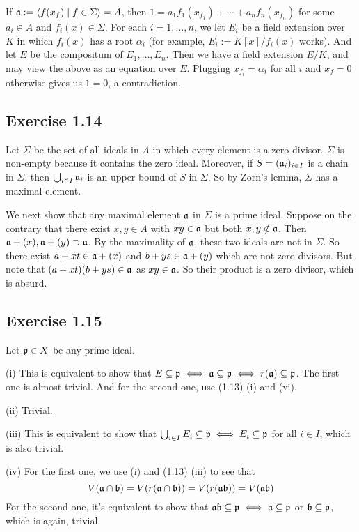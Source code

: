 \documentclass[../A&M.tex]{subfiles}
\begin{document}
If $\mathfrak{a}:=\langle f(x_f) \mid f\in\Sigma \rangle = A$, then $1=a_1f_1(x_{f_1})+\cdots+a_nf_n(x_{f_n})$ for some $a_i\in A$ and $f_i(x)\in\Sigma$. For each $i=1,\ldots,n$, we let $E_i$ be a field extension over $K$ in which $f_i(x)$ has a root $\alpha_i$ (for example, $E_i:=K[x]/f_i(x)$ works). And let $E$ be the compositum of $E_1,\ldots,E_n$. Then we have a field extension $E/K$, and may view the above as an equation over $E$. Plugging $x_{f_i} = \alpha_i$ for all $i$ and $x_f=0$ otherwise gives us $1=0$, a contradiction.

\subsection*{Exercise 1.14}

Let $\Sigma$ be the set of all ideals in $A$ in which every element is a zero divisor. $\Sigma$ is non-empty because it contains the zero ideal. Moreover, if $S=(\mathfrak{a}_i)_{i\in I}$ is a chain in $\Sigma$, then $\bigcup_{i\in I} \mathfrak{a}_i$ is an upper bound of $S$ in $\Sigma$. So by Zorn's lemma, $\Sigma$ has a maximal element.

We next show that any maximal element $\mathfrak{a}$ in $\Sigma$ is a prime ideal. Suppose on the contrary that there exist $x,y\in A$ with $xy\in\mathfrak{a}$ but both $x,y\notin\mathfrak{a}$. Then $\mathfrak{a}+(x),\mathfrak{a}+(y) \supset \mathfrak{a}$. By the maximality of $\mathfrak{a}$, these two ideals are not in $\Sigma$. So there exist $a+xt\in\mathfrak{a}+(x)$ and $b+ys\in\mathfrak{a}+(y)$ which are not zero divisors. But note that $(a+xt)(b+ys) \in \mathfrak{a}$ as $xy\in\mathfrak{a}$. So their product is a zero divisor, which is absurd.

\subsection*{Exercise 1.15}

Let $\mathfrak{p}\in X$ be any prime ideal.

(i) This is equivalent to show that $E \subseteq \mathfrak{p} \iff \mathfrak{a} \subseteq \mathfrak{p} \iff r(\mathfrak{a}) \subseteq \mathfrak{p}$. The first one is almost trivial. And for the second one, use (1.13) (i) and (vi).

(ii) Trivial.

(iii) This is equivalent to show that $\bigcup_{i\in I} E_i \subseteq \mathfrak{p} \iff E_i \subseteq \mathfrak{p}$ for all $i\in I$, which is also trivial.

(iv) For the first one, we use (i) and (1.13) (iii) to see that
$$
V(\mathfrak{a} \cap \mathfrak{b}) = V(r(\mathfrak{a} \cap \mathfrak{b})) =  V(r(\mathfrak{a}\mathfrak{b})) = V(\mathfrak{a}\mathfrak{b}) 
$$
For the second one, it's equivalent to show that $\mathfrak{a}\mathfrak{b} \subseteq \mathfrak{p} \iff \mathfrak{a} \subseteq \mathfrak{p}$ or $\mathfrak{b} \subseteq \mathfrak{p}$, which is again, trivial.
\end{document}
